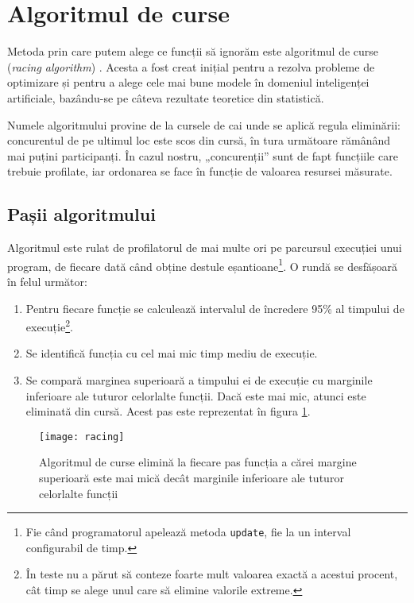 \section{Algoritmul de curse}

Metoda prin care putem alege ce funcții să ignorăm este algoritmul de curse (\textit{racing algorithm}) \cite{hoeffding_races}. Acesta a fost creat inițial pentru a rezolva probleme de optimizare și pentru a alege cele mai bune modele în domeniul inteligenței artificiale, bazându-se pe câteva rezultate teoretice din statistică.

Numele algoritmului provine de la cursele de cai unde se aplică regula eliminării: concurentul de pe ultimul loc este scos din cursă, în tura următoare rămânând mai puțini participanți. În cazul nostru, „concurenții” sunt de fapt funcțiile care trebuie profilate, iar ordonarea se face în funcție de valoarea resursei măsurate.

\subsection{Pașii algoritmului}

Algoritmul este rulat de profilatorul de mai multe ori pe parcursul execuției unui program, de fiecare dată când obține destule eșantioane\footnote{Fie când programatorul apelează metoda \texttt{update}, fie la un interval configurabil de timp.}. O rundă se desfășoară în felul următor:

\begin{enumerate}
    \item Pentru fiecare funcție se calculează intervalul de încredere 95\% al timpului de execuție\footnote{În teste nu a părut să conteze foarte mult valoarea exactă a acestui procent, cât timp se alege unul care să elimine valorile extreme.}.
    \item Se identifică funcția cu cel mai mic timp mediu de execuție.
    \item Se compară marginea superioară a timpului ei de execuție cu marginile inferioare ale tuturor celorlalte funcții. Dacă este mai mic, atunci este eliminată din cursă. Acest pas este reprezentat în figura \ref{fig:racing_algorithm_selection}.
\end{enumerate}

\begin{figure}[h]
    \centering
    \texttt{[image: racing]}
    \caption{Algoritmul de curse elimină la fiecare pas funcția a cărei margine superioară este mai mică decât marginile inferioare ale tuturor celorlalte funcții}
    \label{fig:racing_algorithm_selection}
\end{figure}

